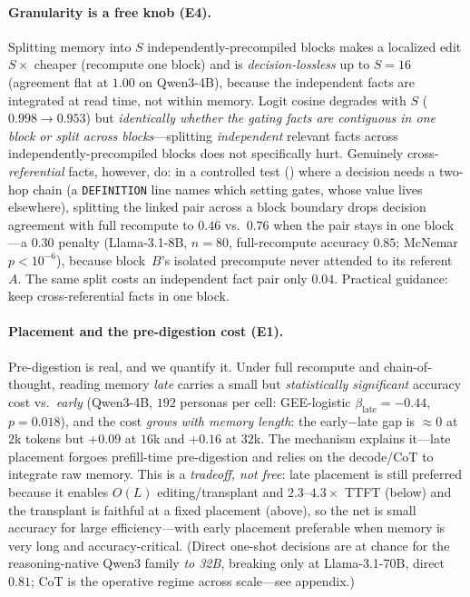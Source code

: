 \paragraph{Granularity is a free knob (E4).} Splitting memory into $S$ independently-precompiled
blocks makes a localized edit $S\times$ cheaper (recompute one block) and is
\emph{decision-lossless} up to $S{=}16$ (agreement flat at $1.00$ on Qwen3-4B), because the
independent facts are integrated at read time, not within memory. Logit cosine degrades with $S$
($0.998\rightarrow0.953$) but \emph{identically whether the gating facts are contiguous in one
block or split across blocks}---splitting \emph{independent} relevant facts across
independently-precompiled blocks does not specifically hurt. Genuinely cross-\emph{referential}
facts, however, do: in a controlled test () where a decision needs a two-hop
chain (a \texttt{DEFINITION} line names which setting gates, whose value lives elsewhere), splitting
the linked pair across a block boundary drops decision agreement with full recompute to $0.46$ vs.\
$0.76$ when the pair stays in one block---a $0.30$ penalty (Llama-3.1-8B, $n{=}80$, full-recompute
accuracy $0.85$; McNemar $p{<}10^{-6}$), because block~$B$'s isolated precompute never attended to
its referent~$A$. The same split costs an independent fact pair only $0.04$. Practical guidance:
keep cross-referential facts in one block.

\paragraph{Placement and the pre-digestion cost (E1).} Pre-digestion is real, and we quantify
it. Under full recompute and chain-of-thought, reading memory \emph{late} carries a small but
\emph{statistically significant} accuracy cost vs.\ \emph{early} (Qwen3-4B, $192$ personas per
cell: GEE-logistic $\beta_{\text{late}}=-0.44$, $p=0.018$), and the cost \emph{grows with memory
length}: the early$-$late gap is ${\approx}0$ at $2$k tokens but ${+}0.09$ at $16$k and ${+}0.16$
at $32$k. The mechanism explains it---late placement forgoes prefill-time pre-digestion and
relies on the decode/CoT to integrate raw memory. This is a \emph{tradeoff, not free}: late
placement is still preferred because it enables $O(L)$ editing/transplant and $2.3$--$4.3\times$
TTFT (below) and the transplant is faithful at a fixed placement (above), so the net is small
accuracy for large efficiency---with early placement preferable when memory is very long and
accuracy-critical. (Direct one-shot decisions are at chance for the reasoning-native Qwen3 family
\emph{to 32B}, breaking only at Llama-3.1-70B, direct $0.81$; CoT is the operative regime across
scale---see appendix.)

